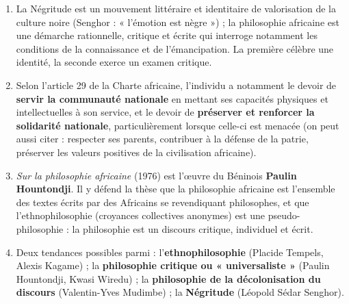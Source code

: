 \documentclass[11pt]{article}
\newcounter{popsec}
\newcounter{popsub}
\newcommand{\courssub}[1]{%
  \stepcounter{popsub}%
  \par\vspace{9pt}\noindent{\popxbold\fontsize{11.5}{13}\selectfont\color{popink}{\color{poporange}\thepopsec.\thepopsub}\hspace{6pt}#1}\par\nopagebreak\vspace{4pt}
}
\begin{document}
\begin{corrige}
\begin{enumerate}
\item La Négritude est un mouvement littéraire et identitaire de valorisation de la culture noire (Senghor : « l'émotion est nègre ») ; la philosophie africaine est une démarche rationnelle, critique et écrite qui interroge notamment les conditions de la connaissance et de l'émancipation. La première célèbre une identité, la seconde exerce un examen critique.
\item Selon l'article 29 de la Charte africaine, l'individu a notamment le devoir de \textbf{servir la communauté nationale} en mettant ses capacités physiques et intellectuelles à son service, et le devoir de \textbf{préserver et renforcer la solidarité nationale}, particulièrement lorsque celle-ci est menacée (on peut aussi citer : respecter ses parents, contribuer à la défense de la patrie, préserver les valeurs positives de la civilisation africaine).
\item \emph{Sur la philosophie africaine} (1976) est l'œuvre du Béninois \textbf{Paulin Hountondji}. Il y défend la thèse que la philosophie africaine est l'ensemble des textes écrits par des Africains se revendiquant philosophes, et que l'ethnophilosophie (croyances collectives anonymes) est une pseudo-philosophie : la philosophie est un discours critique, individuel et écrit.
\item Deux tendances possibles parmi : l'\textbf{ethnophilosophie} (Placide Tempels, Alexis Kagame) ; la \textbf{philosophie critique ou « universaliste »} (Paulin Hountondji, Kwasi Wiredu) ; la \textbf{philosophie de la décolonisation du discours} (Valentin-Yves Mudimbe) ; la \textbf{Négritude} (Léopold Sédar Senghor).
\end{enumerate}
\end{corrige}

\courssub{Je m'entraîne}
\end{document}

